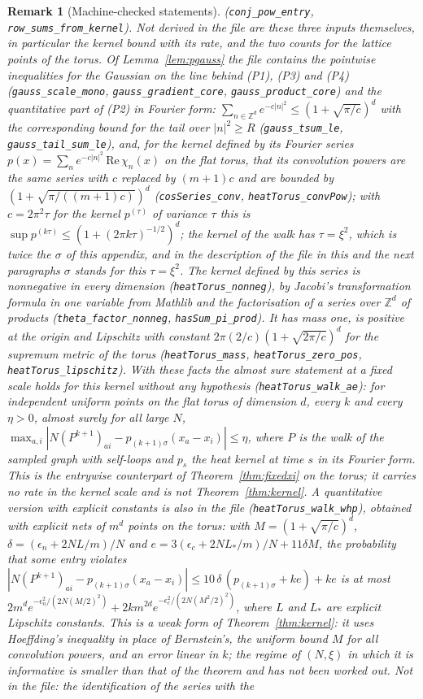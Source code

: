 \documentclass[11pt,a4paper]{article}
\theoremstyle{stmt}
\theoremstyle{defn}
\theoremstyle{rmk}
\newtheorem{remark}[theorem]{Remark}
\numberwithin{equation}{section}
\begin{document}
{\begin{remark}[Machine-checked statements]
(\texttt{conj\_pow\_entry}, \texttt{row\_sums\_from\_kernel}). Not derived in the file are these three inputs themselves, in particular the kernel bound with its rate, and the two counts for the lattice points of the torus. Of Lemma~\ref{lem:pgauss} the file contains the pointwise inequalities for the Gaussian on the line behind (P1), (P3) and (P4) (\texttt{gauss\_scale\_mono}, \texttt{gauss\_gradient\_core}, \texttt{gauss\_product\_core}) and the quantitative part of (P2) in Fourier form: $\sum_{n\in\mathbb Z^d}e^{-c|n|^2}\le(1+\sqrt{\pi/c})^d$ with the corresponding bound for the tail over $|n|^2\ge R$ (\texttt{gauss\_tsum\_le}, \texttt{gauss\_tail\_sum\_le}), and, for the kernel defined by its Fourier series $p(x)=\sum_ne^{-c|n|^2}\,\mathrm{Re}\,\chi_n(x)$ on the flat torus, that its convolution powers are the same series with $c$ replaced by $(m+1)c$ and are bounded by $(1+\sqrt{\pi/((m+1)c)})^d$ (\texttt{cosSeries\_conv}, \texttt{heatTorus\_convPow}); with $c=2\pi^2\tau$ for the kernel $p^{(\tau)}$ of variance $\tau$ this is $\sup p^{(k\tau)}\le(1+(2\pi k\tau)^{-1/2})^d$; the kernel of the walk has $\tau=\xi^2$, which is twice the $\sigma$ of this appendix, and in the description of the file in this and the next paragraphs $\sigma$ stands for this $\tau=\xi^2$. The kernel defined by this series is nonnegative in every dimension (\texttt{heatTorus\_nonneg}), by Jacobi's transformation formula in one variable from Mathlib and the factorisation of a series over $\mathbb Z^d$ of products (\texttt{theta\_factor\_nonneg}, \texttt{hasSum\_pi\_prod}). It has mass one, is positive at the origin and Lipschitz with constant $2\pi(2/c)(1+\sqrt{2\pi/c})^d$ for the supremum metric of the torus (\texttt{heatTorus\_mass}, \texttt{heatTorus\_zero\_pos}, \texttt{heatTorus\_lipschitz}). With these facts the almost sure statement at a fixed scale holds for this kernel without any hypothesis (\texttt{heatTorus\_walk\_ae}): for independent uniform points on the flat torus of dimension $d$, every $k$ and every $\eta>0$, almost surely for all large $N$, $\max_{a,i}|N(P^{k+1})_{ai}-p_{(k+1)\sigma}(x_a-x_i)|\le\eta$, where $P$ is the walk of the sampled graph with self-loops and $p_s$ the heat kernel at time $s$ in its Fourier form. This is the entrywise counterpart of Theorem~\ref{thm:fixedxi} on the torus; it carries no rate in the kernel scale and is not Theorem~\ref{thm:kernel}. A quantitative version with explicit constants is also in the file (\texttt{heatTorus\_walk\_whp}), obtained with explicit nets of $m^d$ points on the torus: with $M=(1+\sqrt{\pi/c})^d$, $\delta=(\epsilon_n+2NL/m)/N$ and $e=3(\epsilon_c+2NL_*/m)/N+11\delta M$, the probability that some entry violates $|N(P^{k+1})_{ai}-p_{(k+1)\sigma}(x_a-x_i)|\le10\,\delta\,(p_{(k+1)\sigma}+ke)+ke$ is at most $2m^de^{-\epsilon_n^2/(2N(M/2)^2)}+2km^{2d}e^{-\epsilon_c^2/(2N(M^2/2)^2)}$, where $L$ and $L_*$ are explicit Lipschitz constants. This is a weak form of Theorem~\ref{thm:kernel}: it uses Hoeffding's inequality in place of Bernstein's, the uniform bound $M$ for all convolution powers, and an error linear in $k$; the regime of $(N,\xi)$ in which it is informative is smaller than that of the theorem and has not been worked out. Not in the file: the identification of the series with the 
\end{remark}}
\end{document}
